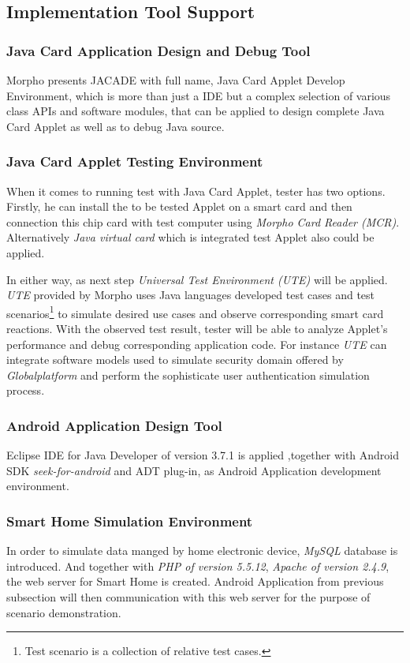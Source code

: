 \subsection{Implementation Tool Support}
\subsubsection{Java Card Application Design and Debug Tool}
Morpho presents JACADE with full name, Java Card Applet Develop Environment, which is more than just a IDE but a complex selection of various class APIs and software modules, that can be applied to design complete Java Card Applet as well as to debug Java source. 
\subsubsection{Java Card Applet Testing Environment}
When it comes to running test with Java Card Applet, tester has two options. Firstly, he can install the to be tested Applet on a smart card and then connection this chip card with test computer using \emph{Morpho Card Reader (MCR)}. Alternatively \emph{Java virtual card} which is integrated test Applet also could be applied. 

In either way, as next step \emph{Universal Test Environment (UTE)} will be applied. \emph{UTE} provided by Morpho uses Java languages developed test cases
 and test scenarios\footnote{Test scenario is a collection of relative test cases.} to simulate desired use cases and observe corresponding smart card reactions. With the observed test result, tester will be able to analyze Applet's performance and debug corresponding application code. For instance \emph{UTE} can integrate software models used to simulate security domain offered by \emph{Globalplatform} and perform the sophisticate user authentication simulation process.
\subsubsection{Android Application Design Tool}
Eclipse IDE for Java Developer of version 3.7.1 is applied ,together with Android SDK \emph{seek-for-android} and ADT plug-in, as Android Application development environment. 
\subsubsection{Smart Home Simulation Environment}
In order to simulate data manged by home electronic device, \emph{MySQL} database is introduced. And together with \emph{PHP of version 5.5.12}, \emph{Apache of version 2.4.9}, the web server for Smart Home is created. Android Application from previous subsection will then communication with this web server for the purpose of scenario demonstration.